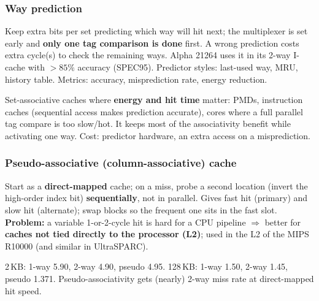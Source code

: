 \subsubsection{Way prediction}
Keep extra bits per set predicting which way will hit next; the multiplexer is set early and \textbf{only one tag comparison is done} first. A wrong prediction costs extra cycle(s) to check the remaining ways. Alpha 21264 uses it in its 2-way I-cache with $>85\%$ accuracy (SPEC95). Predictor styles: last-used way, MRU, history table. Metrics: accuracy, misprediction rate, energy reduction.
\begin{pick}
Set-associative caches where \textbf{energy and hit time} matter: PMDs, instruction caches (sequential access makes prediction accurate), cores where a full parallel tag compare is too slow/hot. It keeps most of the associativity benefit while activating one way. Cost: predictor hardware, an extra access on a misprediction.
\end{pick}

\subsubsection{Pseudo-associative (column-associative) cache}
Start as a \textbf{direct-mapped} cache; on a miss, probe a second location (invert the high-order index bit) \textbf{sequentially}, not in parallel. Gives fast hit (primary) and slow hit (alternate); swap blocks so the frequent one sits in the fast slot. \textbf{Problem:} a variable 1-or-2-cycle hit is hard for a CPU pipeline $\Rightarrow$ better for \textbf{caches not tied directly to the processor (L2)}; used in the L2 of the MIPS R10000 (and similar in UltraSPARC).
\begin{ex}
2\,KB: 1-way 5.90, 2-way 4.90, pseudo 4.95. 128\,KB: 1-way 1.50, 2-way 1.45, pseudo 1.371. Pseudo-associativity gets (nearly) 2-way miss rate at direct-mapped hit speed.
\end{ex}



